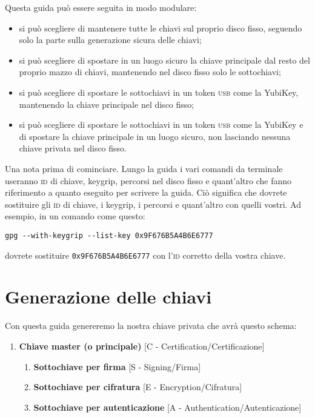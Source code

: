 \documentclass[a4paper,10pt]{article}
\begin{document}
Questa guida può essere seguita in modo modulare:

\begin{itemize}
 \item si può scegliere di mantenere tutte le chiavi sul proprio disco fisso, seguendo solo la parte sulla generazione sicura delle chiavi;
 \item si può scegliere di spostare in un luogo sicuro la chiave principale dal resto del proprio mazzo di chiavi, mantenendo nel disco fisso solo le sottochiavi;
 \item si può scegliere di spostare le sottochiavi in un token \textsc{usb} come la YubiKey, mantenendo la chiave principale nel disco fisso;
 \item si può scegliere di spostare le sottochiavi in un token \textsc{usb} come la YubiKey e di spostare la chiave principale in un luogo sicuro, non lasciando nessuna chiave privata nel disco fisso.
\end{itemize}

Una nota prima di cominciare. Lungo la guida i vari comandi da terminale useranno \textsc{id} di chiave, keygrip, percorsi nel disco fisso e quant'altro che fanno riferimento a quanto eseguito per scrivere la guida. Ciò significa che dovrete sostituire gli \textsc{id} di chiave, i keygrip, i percorsi e quant'altro con quelli vostri. Ad esempio, in un comando come questo:

\begin{lstlisting}
gpg --with-keygrip --list-key 0x9F676B5A4B6E6777
\end{lstlisting}

dovrete sostituire \texttt{0x9F676B5A4B6E6777} con l'\textsc{id} corretto della vostra chiave.

\section{Generazione delle chiavi}

Con questa guida genereremo la nostra chiave privata che avrà questo schema:

\begin{enumerate}
 \item \textbf{Chiave master (o principale)} [C - Certification/Certificazione]
 \begin{enumerate}
  \item \textbf{Sottochiave per firma} [S - Signing/Firma]
  \item \textbf{Sottochiave per cifratura} [E - Encryption/Cifratura]
  \item \textbf{Sottochiave per autenticazione} [A - Authentication/Autenticazione]
 \end{enumerate}
\end{enumerate}
\end{document}
